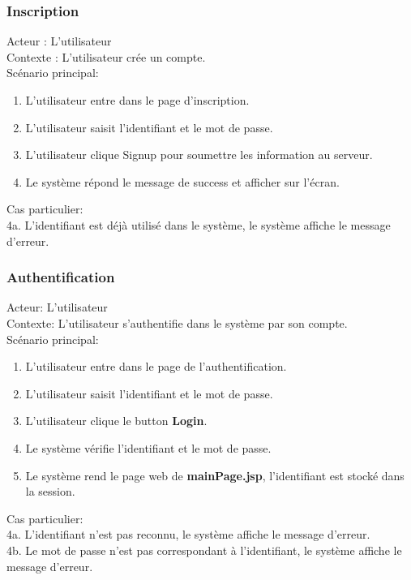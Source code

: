 \documentclass[14px]{article}
\begin{document}
\subsubsection{Inscription}
Acteur : L'utilisateur\\
Contexte : L'utilisateur crée un compte.\\
Scénario principal:
\begin{enumerate}
	\item L'utilisateur entre dans le page d'inscription.
	\item L'utilisateur saisit l'identifiant et le mot de passe.
	\item L'utilisateur clique Signup pour soumettre les information au serveur.
	\item Le système répond le message de success et afficher sur l'écran.
\end{enumerate}
Cas particulier:\\
4a. L'identifiant est déjà utilisé dans le système, le système affiche le message d'erreur.

\subsubsection{Authentification}
Acteur: L'utilisateur\\
Contexte: L'utilisateur s'authentifie dans le système par son compte.\\
Scénario principal:
\begin{enumerate}
	\item L'utilisateur entre dans le page de l'authentification.
	\item L'utilisateur saisit l'identifiant et le mot de passe.
	\item L'utilisateur clique le button \textbf{Login}.
	\item Le système vérifie l'identifiant et le mot de passe.
	\item Le système rend le page web de \textbf{mainPage.jsp}, l'identifiant est stocké dans la session.
\end{enumerate}
Cas particulier: \\
4a. L'identifiant n'est pas reconnu, le système affiche le message d'erreur.\\
4b. Le mot de passe n'est pas correspondant à l'identifiant, le système affiche le message d'erreur.
\end{document}
